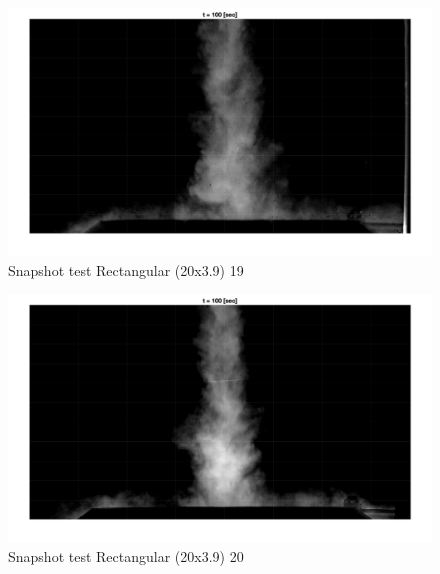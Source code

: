 \begin{figure}[ht!]
    \centering
    \includegraphics[width=\linewidth]{Images/Rec20_19_t100.jpg}
    \caption{Snapshot test Rectangular (20x3.9) 19}
\end{figure}

\begin{figure}[ht!]
    \centering
    \includegraphics[width=\linewidth]{Images/Rec20_20_t100.jpg}
    \caption{Snapshot test Rectangular (20x3.9) 20}
\end{figure}














